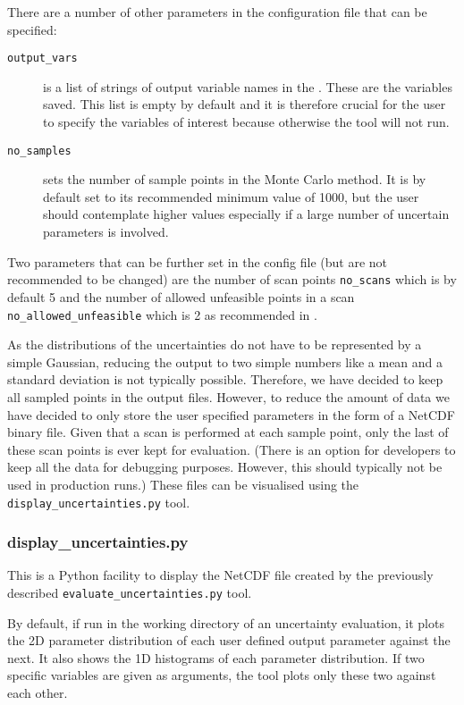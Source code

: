 There are a number of other parameters in the configuration file that can be specified:
\begin{description}
\item[\texttt{output\_vars}] is a list of strings of output variable names in
  the \mfile. These are the variables saved. This list is empty by default and
  it is therefore crucial for the user to specify the variables of interest
  because otherwise the tool will not run.
\item[\texttt{no\_samples}] sets the number of sample points in the Monte
  Carlo method. It is by default set to its recommended minimum value of 1000,
  but the user should contemplate higher values especially if a large number
  of uncertain parameters is involved.
\end{description}
Two parameters that can be further set in the config file (but are not
recommended to be changed) are the number of scan points \texttt{no\_scans}
which is by default 5 and the number of allowed unfeasible points in a scan
\texttt{no\_allowed\_unfeasible} which is 2 as recommended in
\cite{WPPMI2014Report}.

As the distributions of the uncertainties do not have to be represented by a
simple Gaussian, reducing the output to two simple numbers like a mean and a
standard deviation is not typically possible. Therefore, we have decided to
keep all sampled points in the output files. However, to reduce the amount of
data we have decided to only store the user specified parameters in the form
of a NetCDF binary file. Given that a scan is performed at each sample point,
only the last of these scan points is ever kept for evaluation. (There is an
option for developers to keep all the data for debugging purposes. However,
this should typically not be used in production runs.) These files can be
visualised using the \texttt{display\_uncertainties.py} tool.


\subsubsection{display\_uncertainties.py}

This is a Python facility to display the NetCDF file created by the previously
described \texttt{evaluate\_uncertainties.py} tool.

By default, if run in the working directory of an uncertainty evaluation, it
plots the 2D parameter distribution of each user defined output parameter
against the next. It also shows the 1D histograms of each parameter
distribution. If two specific variables are given as arguments, the tool plots
only these two against each other.

